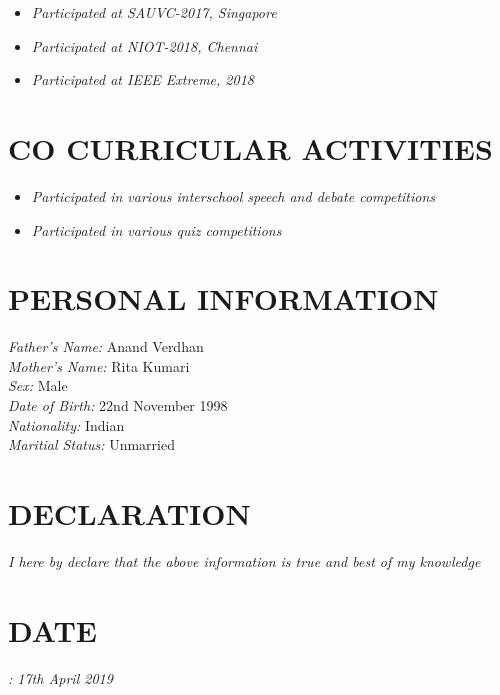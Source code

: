 \documentclass[margin]{res}
\begin{document}
\begin{enumerate}
\begin{itemize}
\item{\sl Participated at SAUVC-2017, Singapore}

\item{\sl Participated at NIOT-2018, Chennai}
\item{\sl Participated at IEEE Extreme, 2018}
\end{itemize}

\section{CO CURRICULAR ACTIVITIES}\begin{itemize}
\item{\sl Participated in various interschool speech and debate competitions}
\item{\sl Participated in various quiz competitions}
\end{itemize}


\section{PERSONAL INFORMATION}
{\sl Father's Name:} Anand Verdhan\\
{\sl Mother's Name:} Rita Kumari\\
{\sl Sex:} Male\\
{\sl Date of Birth:} 22nd November 1998\\
{\sl Nationality:} Indian\\
{\sl Maritial Status:} Unmarried\\

\section{DECLARATION} 
{\sl I here by declare that the above information is true and best of my knowledge}

 \section{DATE}
 {\sl : 17th April 2019}



	\end{enumerate}
\end{document}
